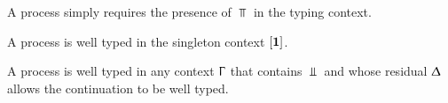 \begin{AgdaAlign}
A  process simply requires the presence of $\Top$
in the typing context.

\begin{code}%
%
\>[3]%
\>[13]\AgdaSymbol{:}\AgdaSpace{}%
\AgdaSpace{}%
\AgdaOperator{\AgdaFunction{[}}\AgdaSpace{}%
\AgdaSpace{}%
\AgdaOperator{\AgdaFunction{]}}\<%
\end{code}

A  process is well typed in the singleton
context $[\mathbf{1}]$.

\begin{code}%
%
\>[3]%
\>[13]\AgdaSymbol{:}\AgdaSpace{}%
\AgdaSpace{}%
\AgdaSymbol{\}}\AgdaSpace{}%
\AgdaSymbol{(}\AgdaSpace{}%
\AgdaSymbol{:}\AgdaSpace{}%
\AgdaSpace{}%
\AgdaSpace{}%
\AgdaSpace{}%
\AgdaOperator{\AgdaFunction{,}}\AgdaSpace{}%
\AgdaSymbol{)}\AgdaSpace{}%
\AgdaSpace{}%
\AgdaSpace{}%
\AgdaSpace{}%
\AgdaSpace{}%
\AgdaSpace{}%
\<%
\end{code}

A  process is well typed in any context
$\Upgamma$ that contains $\Bot$ and whose residual $\Updelta$ allows the
continuation to be well typed.

\begin{code}%
%
\>[3]%
\>[13]\AgdaSymbol{:}%
\>[1529I]\AgdaSpace{}%
\AgdaSpace{}%
\AgdaSpace{}%
\AgdaSymbol{\}}\AgdaSpace{}%
\AgdaSymbol{(}\AgdaSpace{}%
\AgdaSymbol{:}\AgdaSpace{}%
\AgdaSymbol{)}\AgdaSpace{}%
\AgdaSymbol{(}\AgdaSpace{}%
\AgdaSymbol{:}\AgdaSpace{}%
\AgdaSpace{}%
\AgdaSpace{}%
\AgdaSpace{}%
\AgdaSpace{}%
\AgdaSpace{}%
\AgdaOperator{\AgdaFunction{,}}\AgdaSpace{}%
\AgdaSymbol{)}\AgdaSpace{}%
\<%
\\
\>[.][@{}l@{}]\<[1529I]%
\>[15]\AgdaSpace{}%
\AgdaSymbol{((}\AgdaSpace{}%
\AgdaSpace{}%
\AgdaSpace{}%
\AgdaSpace{}%
\AgdaSpace{}%
\AgdaSymbol{)}\AgdaSpace{}%
\AgdaSpace{}%
\AgdaSymbol{)}\AgdaSpace{}%
\AgdaSpace{}%
\AgdaSpace{}%
\<%
\end{code}


\end{AgdaAlign}

